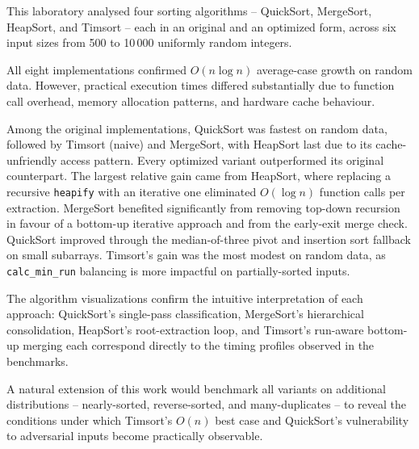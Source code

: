 \documentclass[12pt,a4paper]{article}
\begin{document}
	This laboratory analysed four sorting algorithms -- QuickSort, MergeSort,
	HeapSort, and Timsort -- each in an original and an optimized form, across six
	input sizes from 500 to 10\,000 uniformly random integers.
	
	All eight implementations confirmed $O(n\log n)$ average-case growth on random
	data. However, practical execution times differed substantially due to function
	call overhead, memory allocation patterns, and hardware cache behaviour.
	
	Among the original implementations, QuickSort was fastest on random data,
	followed by Timsort (naive) and MergeSort, with HeapSort last due to its
	cache-unfriendly access pattern. Every optimized variant outperformed its
	original counterpart. The largest relative gain came from HeapSort, where
	replacing a recursive \texttt{heapify} with an iterative one eliminated
	$O(\log n)$ function calls per extraction. MergeSort benefited significantly
	from removing top-down recursion in favour of a bottom-up iterative approach
	and from the early-exit merge check. QuickSort improved through the
	median-of-three pivot and insertion sort fallback on small subarrays. Timsort's
	gain was the most modest on random data, as \texttt{calc\_min\_run} balancing
	is more impactful on partially-sorted inputs.
	
	The algorithm visualizations confirm the intuitive interpretation of each
	approach: QuickSort's single-pass classification, MergeSort's hierarchical
	consolidation, HeapSort's root-extraction loop, and Timsort's run-aware
	bottom-up merging each correspond directly to the timing profiles observed in
	the benchmarks.
	
	A natural extension of this work would benchmark all variants on additional
	distributions -- nearly-sorted, reverse-sorted, and many-duplicates -- to
	reveal the conditions under which Timsort's $O(n)$ best case and QuickSort's
	vulnerability to adversarial inputs become practically observable.
	
\end{document}
